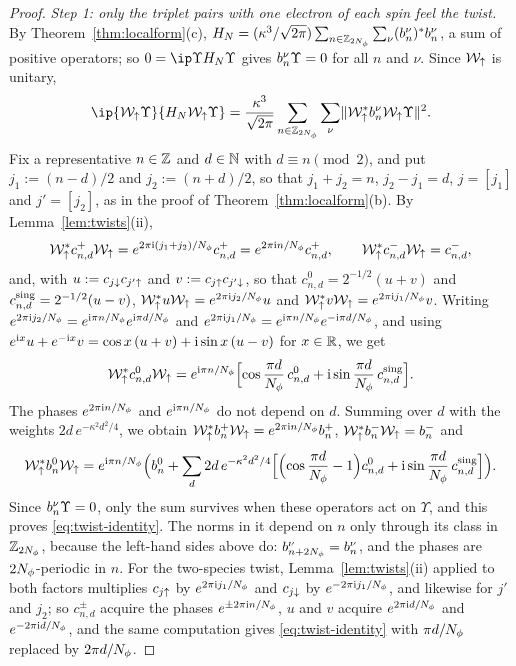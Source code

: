 \begin{proof}
\emph{Step 1: only the triplet pairs with one electron of each spin feel the twist.} By
Theorem~\ref{thm:localform}(c), $H_N=(\kappa^3/\sqrt{2\pi})\sum_{n\in\mathbb{Z}_{2N_{\phi}}}\sum_\nu(b^{\nu}_{n})^*b^{\nu}_{n}$, a sum of positive
operators; so $0=\ip\Upsilon{H_N\Upsilon}$ gives $b^{\nu}_{n}\Upsilon=0$ for all $n$ and $\nu$. Since $\mathcal W_{\uparrow}$ is unitary,
\[
\ip{\mathcal W_\up\Upsilon}{H_N\mathcal W_\up\Upsilon}=\frac{\kappa^3}{\sqrt{2\pi}}\sum_{n\in\Z_{2\Nphi}}\sum_\nu\norm{\mathcal W_\up^*\bcen\nu n\mathcal W_\up\Upsilon}^2 .
\]
Fix a representative $n\in\mathbb{Z}$ and $d\in\mathbb{N}$ with $d\equiv n\pmod2$, and put $j_1:=(n-d)/2$ and $j_2:=(n+d)/2$, so that
$j_1+j_2=n$, $j_2-j_1=d$, $j=[j_1]$ and $j'=[j_2]$, as in the proof of Theorem~\ref{thm:localform}(b). By
Lemma~\ref{lem:twists}(ii),
\[
\mathcal W_{\uparrow}^*c^+_{n,d}\mathcal W_{\uparrow}=e^{2\pi\mathrm{i}(j_1+j_2)/N_{\phi}}c^+_{n,d}=e^{2\pi\mathrm{i} n/N_{\phi}}c^+_{n,d},\qquad
\mathcal W_{\uparrow}^*c^-_{n,d}\mathcal W_{\uparrow}=c^-_{n,d},
\]
and, with $u:=c_{j{\downarrow}}c_{j'{\uparrow}}$ and $v:=c_{j{\uparrow}}c_{j'{\downarrow}}$, so that $c^0_{n,d}=2^{-1/2}(u+v)$ and
$c^{\rm sing}_{n,d}=2^{-1/2}(u-v)$, $\mathcal W_{\uparrow}^*u\mathcal W_{\uparrow}=e^{2\pi\mathrm{i} j_2/N_{\phi}}u$ and $\mathcal W_{\uparrow}^*v\mathcal W_{\uparrow}=e^{2\pi\mathrm{i} j_1/N_{\phi}}v$.
Writing $e^{2\pi\mathrm{i} j_2/N_{\phi}}=e^{\mathrm{i}\pi n/N_{\phi}}e^{\mathrm{i}\pi d/N_{\phi}}$ and $e^{2\pi\mathrm{i} j_1/N_{\phi}}=e^{\mathrm{i}\pi n/N_{\phi}}e^{-\mathrm{i}\pi d/N_{\phi}}$, and
using $e^{\mathrm{i} x}u+e^{-\mathrm{i} x}v=\cos x\,(u+v)+\mathrm{i}\sin x\,(u-v)$ for $x\in\mathbb{R}$, we get
\[
\mathcal W_{\uparrow}^*c^0_{n,d}\mathcal W_{\uparrow}=e^{\mathrm{i}\pi n/N_{\phi}}\Bigl[\cos\frac{\pi d}{N_{\phi}}\,c^0_{n,d}+\mathrm{i}\sin\frac{\pi d}{N_{\phi}}\,c^{\rm sing}_{n,d}\Bigr].
\]
The phases $e^{2\pi\mathrm{i} n/N_{\phi}}$ and $e^{\mathrm{i}\pi n/N_{\phi}}$ do not depend on $d$. Summing over $d$ with the weights
$2d\,e^{-\kappa^2d^2/4}$, we obtain $\mathcal W_{\uparrow}^*b^{+}_{n}\mathcal W_{\uparrow}=e^{2\pi\mathrm{i} n/N_{\phi}}b^{+}_{n}$, $\mathcal W_{\uparrow}^*b^{-}_{n}\mathcal W_{\uparrow}=b^{-}_{n}$
and
\[
\mathcal W_{\uparrow}^*b^{0}_{n}\mathcal W_{\uparrow}=e^{\mathrm{i}\pi n/N_{\phi}}\Bigl(b^{0}_{n}+\sum_d2d\,e^{-\kappa^2d^2/4}\Bigl[\Bigl(\cos\frac{\pi d}{N_{\phi}}-1\Bigr)c^0_{n,d}
+\mathrm{i}\sin\frac{\pi d}{N_{\phi}}\,c^{\rm sing}_{n,d}\Bigr]\Bigr).
\]
Since $b^{\nu}_{n}\Upsilon=0$, only the sum survives when these operators act on $\Upsilon$, and this proves
\eqref{eq:twist-identity}. The norms in it depend on $n$ only through its class in $\mathbb{Z}_{2N_{\phi}}$, because the left-hand
sides above do: $b^{\nu}_{n+2N_{\phi}}=b^{\nu}_{n}$, and the phases are $2N_{\phi}$-periodic in $n$. For the two-species twist,
Lemma~\ref{lem:twists}(ii) applied to both factors multiplies $c_{j{\uparrow}}$ by $e^{2\pi\mathrm{i} j_1/N_{\phi}}$ and $c_{j{\downarrow}}$ by
$e^{-2\pi\mathrm{i} j_1/N_{\phi}}$, and likewise for $j'$ and $j_2$; so $c^\pm_{n,d}$ acquire the phases $e^{\pm2\pi\mathrm{i} n/N_{\phi}}$, $u$ and
$v$ acquire $e^{2\pi\mathrm{i} d/N_{\phi}}$ and $e^{-2\pi\mathrm{i} d/N_{\phi}}$, and the same computation gives \eqref{eq:twist-identity} with
$\pi d/N_{\phi}$ replaced by $2\pi d/N_{\phi}$.


\end{proof}
